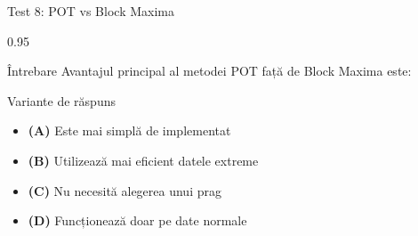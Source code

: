\documentclass[9pt, aspectratio=169, t]{beamer}
\begin{document}
\begin{frame}{Test 8: POT vs Block Maxima}
    \begin{cminipage}{0.95\textwidth}
    \begin{alertblock}{Întrebare}
        Avantajul principal al metodei POT față de Block Maxima este:
    \end{alertblock}
    \begin{block}{Variante de răspuns}
    \begin{itemize}\setlength{\itemsep}{0pt}
        \item \textcolor{MainBlue}{\textbf{(A)}} Este mai simplă de implementat
        \item \textcolor{MainBlue}{\textbf{(B)}} Utilizează mai eficient datele extreme
        \item \textcolor{MainBlue}{\textbf{(C)}} Nu necesită alegerea unui prag
        \item \textcolor{MainBlue}{\textbf{(D)}} Funcționează doar pe date normale
    \end{itemize}
    \end{block}
    \end{cminipage}
\end{frame}
\end{document}
